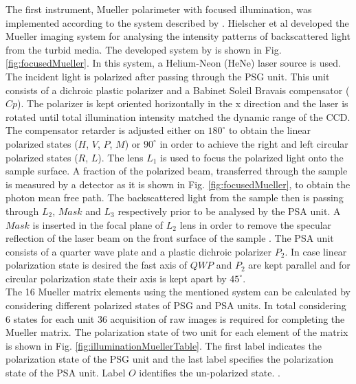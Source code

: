 \documentclass[oneside,a4,12p]{report} %
\begin{document}
The first instrument, Mueller polarimeter with focused illumination, was implemented according to the system described by \cite{hielscher1997diffuse}. Hielscher et al \cite{hielscher1997diffuse} developed the Mueller imaging system for analysing the intensity patterns of backscattered light from the turbid media. The developed system by \cite{antonelli2011biomedical} is shown in Fig.\ref{fig:focusedMueller}. In this system, a Helium-Neon (HeNe) laser source is used. The incident light is polarized after passing through the PSG unit. This unit consists of a dichroic plastic polarizer and a Babinet Soleil Bravais compensator ($Cp$). The polarizer is kept oriented horizontally in the x direction and the laser is rotated until total illumination intensity matched the dynamic range of the CCD. The compensator retarder is adjusted either on $180^{\circ}$ to obtain the linear polarized states ($H$, $V$, $P$, $M$) or $90^{\circ}$ in order to achieve the right and left circular polarized states ($R$, $L$). The lens $L_{1}$ is used to focus the polarized light onto the sample surface. A fraction of the polarized beam, transferred through the sample is measured by a detector as it is shown in Fig. \ref{fig:focusedMueller}, to obtain the photon mean free path. The backscattered light from the sample then is passing through $L_{2}$, $Mask$ and $L_{3}$ respectively prior to be analysed by the PSA unit. A $Mask$ is inserted in the focal plane of $L_{2}$ lens in order to remove the specular reflection of the laser beam on the front surface of the sample \cite{antonelli2011biomedical}. The PSA unit consists of a quarter wave plate and a plastic dichroic polarizer $P_{2}$. In case linear polarization state is desired the fast axis of $QWP$ and $P_{2}$ are kept parallel and for circular polarization state their axis is kept apart by $45^{\circ}$.\\

The 16 Mueller matrix elements using the mentioned system can be calculated by considering different polarized states of PSG and PSA units. In total considering 6 states for each unit 36 acquisition of raw images is required for completing the Mueller matrix. The polarization state of two unit for each element of the matrix is shown in Fig. \ref{fig:illuminationMuellerTable}. The first label indicates the polarization state of the PSG unit and the last label specifies the polarization state of the PSA unit. Label $O$ identifies the un-polarized state. \cite{antonelli2011biomedical,hielscher1997diffuse}. \\
\end{document}
